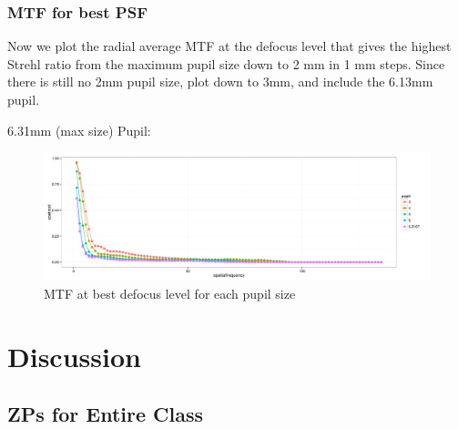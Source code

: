 \documentclass{article}
\begin{document}
\subsubsection{MTF for best PSF}
Now we plot the radial average MTF at the defocus level that gives the highest Strehl ratio from the maximum pupil size down to 2 mm in 1 mm steps. Since there is still no 2mm pupil size, plot down to 3mm, and include the 6.13mm pupil.

6.31mm (max size) Pupil:
\begin{figure}[H]
  \centering
  \includegraphics[width=1\linewidth]{mtfvasha.pdf}
  \caption{MTF at best defocus level for each pupil size}
  \label{fig:vmtf}
\end{figure}

\section{Discussion}

\subsection{ZPs for Entire Class}
\end{document}
